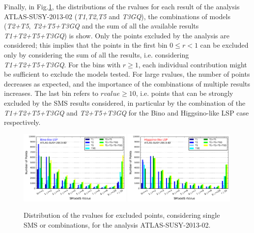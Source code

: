\documentclass[a4paper,10pt]{article}
\begin{document}
%
Finally, in Fig.\ref{Histos_r}, the distributions of the rvalues for each result of the analysis ATLAS-SUSY-2013-02 (\textit{T1},\textit{T2},\textit{T5} and \textit{T3GQ}), the combinations of models (\textit{T2+T5}, \textit{T2+T5+T3GQ} and the sum of all the available results \textit{T1+T2+T5+T3GQ}) is show. Only the points excluded by the analysis are considered; this implies that the points in the first bin $0\leq r < 1$ can be excluded only by considering the sum of all the results, i.e. considering \textit{T1+T2+T5+T3GQ}. For the bins with $r \geq 1$, each individual contribution might be sufficient to exclude the models tested. For large rvalues, the number of points decreases as expected, and the importance of the combinations of multiple results increases. The last bin refers to $rvalue \geq 10$, i.e. points that can be strongly excluded by the SMS results considered, in particular by the combination of the \textit{T1+T2+T5+T3GQ} and \textit{T2+T5+T3GQ} for the Bino and Higgsino-like LSP case respectively. 
\begin{figure}[!]
\begin{center}
\subfigure
{\includegraphics[width=0.49\textwidth]{PLOTS/Combination/ATLAS-SUSY-2013-02_Bino_rValuesHisto.pdf}}
\subfigure
{\includegraphics[width=0.49\textwidth]{PLOTS/Combination/ATLAS-SUSY-2013-02_Higgsino_rValuesHisto.pdf}}
\end{center}
\caption{Distribution of the rvalues for excluded points, considering single SMS or combinations, for the analysis ATLAS-SUSY-2013-02.} 
\label{Histos_r}
\end{figure}
\end{document}
